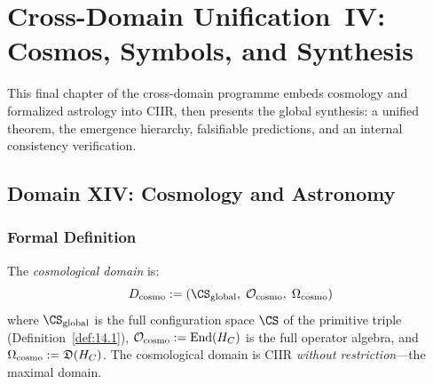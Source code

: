 
\chapter{Cross-Domain Unification~IV: Cosmos, Symbols, and Synthesis}
\label{ch:cross-domain-IV}

\vspace{0.5em}
\noindent
This final chapter of the cross-domain programme embeds cosmology and
formalized astrology into CIIR, then presents the global synthesis:
a unified theorem, the emergence hierarchy, falsifiable predictions,
and an internal consistency verification.

\section{Domain XIV: Cosmology and Astronomy}
\label{sec:ch19:cosmo}

\subsection{Formal Definition}

\begin{definition}\label{def:19.1}
The \emph{cosmological domain} is:
\[
  D_{\mathrm{cosmo}} := (\CS_{\mathrm{global}},\;
                         \mathcal{O}_{\mathrm{cosmo}},\;
                         \Omega_{\mathrm{cosmo}})
\]
where $\CS_{\mathrm{global}}$ is the full configuration space $\CS$
of the primitive triple (Definition~\ref{def:14.1}),
$\mathcal{O}_{\mathrm{cosmo}} := \mathrm{End}(H_C)$ is the full
operator algebra, and $\Omega_{\mathrm{cosmo}} :=
\mathfrak{D}(H_C)$.  The cosmological domain is CIIR
\emph{without restriction}—the maximal domain.
\end{definition}

